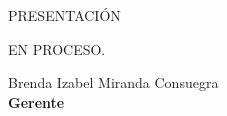 \begin{center}
{\Bold \LARGE PRESENTACIÓN}\\[2cm]
\end{center}

EN PROCESO. 

\begin{center}
Brenda Izabel Miranda Consuegra\\
\textbf{Gerente}
\end{center}

